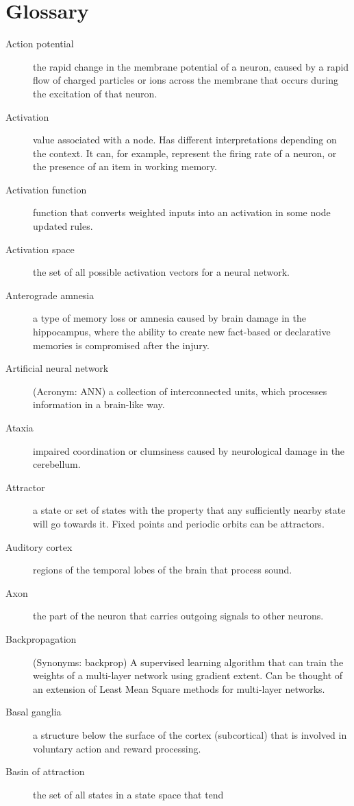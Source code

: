 \chapter*{Glossary}
\begin{description}

\item[Action potential] the rapid change in the membrane potential of a neuron, caused by a rapid flow of charged particles or ions across the membrane that occurs during the excitation of that neuron.
\item[Activation] value associated with a node. Has different interpretations depending on the context. It can, for example, represent the firing rate of a neuron, or the presence of an item in working memory.
\item[Activation function] function that converts weighted inputs into an activation in some node updated rules.
\item[Activation space] the set of all possible activation vectors for a neural network.
\item[Anterograde amnesia] a type of memory loss or amnesia caused by brain damage in the hippocampus, where the ability to create new fact-based or declarative memories is compromised after the injury. 
\item[Artificial neural network] (Acronym: ANN) a collection of interconnected units, which processes information in a brain-like way.
\item[Ataxia] impaired coordination or clumsiness caused by neurological damage in the cerebellum.
\item[Attractor] a state or set of states with the property that any  sufficiently nearby state will go towards it. Fixed points and periodic orbits can be attractors.
\item[Auditory cortex] regions of the temporal lobes of the brain that process sound. 
\item[Axon] the part of the neuron that carries outgoing signals to other neurons.
\item[Backpropagation] (Synonyms: backprop) A supervised learning algorithm that can train the weights of a multi-layer network using gradient extent. Can be thought of an extension of Least Mean Square methods for multi-layer networks. 
\item[Basal ganglia] a structure below the surface of the cortex (subcortical) that is involved in voluntary action and reward processing.
\item[Basin of attraction] the set of all states in a state space that tend 

\end{description}

